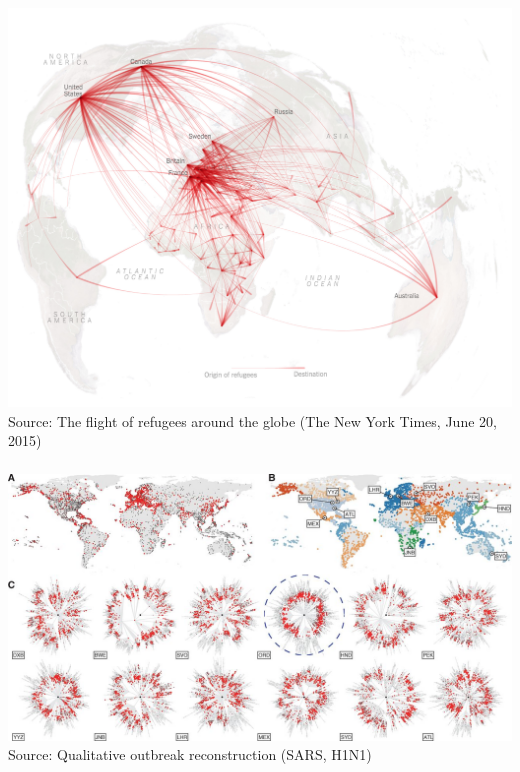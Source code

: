 \documentclass[8pt]{beamer}
\begin{document}

\begin{frame}
\frametitle{\insertsection}
\centering
\includegraphics[width=\linewidth,height=0.8\textheight,keepaspectratio]{refugees}\\
\tiny Source: The flight of refugees around the globe (The New York Times, June 20, 2015)
\end{frame}



\begin{frame}
\frametitle{\insertsection}
\centering
\includegraphics[width=\linewidth,height=0.9\textheight,keepaspectratio]{outbreak}\\
\tiny Source: Qualitative outbreak reconstruction (SARS, H1N1) \cite{Brockmann2013}
\end{frame}
\end{document}

